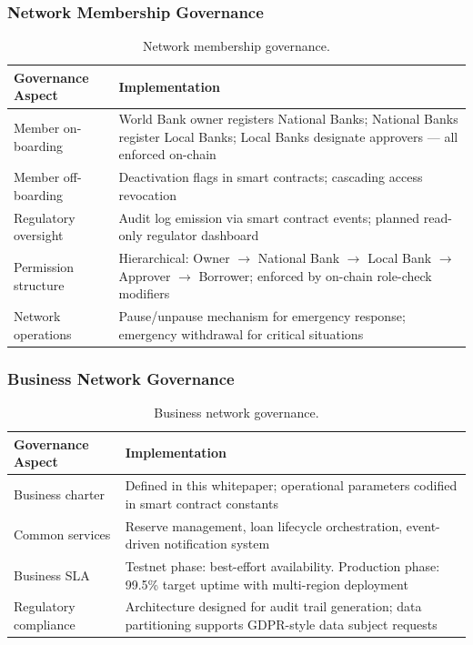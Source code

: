 \documentclass[11pt,a4paper]{article}
\newcommand{\tableheadfont}{\bfseries\small\color{PrimaryBlue}}
\newenvironment{moderntable}[1][H]{%
    \begin{table}[#1]\centering\small%
    \renewcommand{\arraystretch}{1.35}%
}{%
    \end{table}%
}
\begin{document}
\subsubsection{Network Membership Governance}

\begin{moderntable}
\caption{Network membership governance.}
\begin{tabular}{@{} >{\raggedright}p{3.5cm} >{\raggedright\arraybackslash}p{8.5cm} @{}}
\toprule
\tableheadfont Governance Aspect & \tableheadfont Implementation \\
\midrule
\rowcolor{RowShade}
Member on-boarding & World Bank owner registers National Banks; National Banks register Local Banks; Local Banks designate approvers --- all enforced on-chain \\
Member off-boarding & Deactivation flags in smart contracts; cascading access revocation \\
\rowcolor{RowShade}
Regulatory oversight & Audit log emission via smart contract events; planned read-only regulator dashboard \\
Permission structure & Hierarchical: Owner $\to$ National Bank $\to$ Local Bank $\to$ Approver $\to$ Borrower; enforced by on-chain role-check modifiers \\
\rowcolor{RowShade}
Network operations & Pause/unpause mechanism for emergency response; emergency withdrawal for critical situations \\
\bottomrule
\end{tabular}
\end{moderntable}

\subsubsection{Business Network Governance}

\begin{moderntable}
\caption{Business network governance.}
\begin{tabular}{@{} >{\raggedright}p{3.5cm} >{\raggedright\arraybackslash}p{8.5cm} @{}}
\toprule
\tableheadfont Governance Aspect & \tableheadfont Implementation \\
\midrule
\rowcolor{RowShade}
Business charter & Defined in this whitepaper; operational parameters codified in smart contract constants \\
Common services & Reserve management, loan lifecycle orchestration, event-driven notification system \\
\rowcolor{RowShade}
Business SLA & Testnet phase: best-effort availability. Production phase: 99.5\% target uptime with multi-region deployment \\
Regulatory compliance & Architecture designed for audit trail generation; data partitioning supports GDPR-style data subject requests \\
\bottomrule
\end{tabular}
\end{moderntable}
\end{document}

